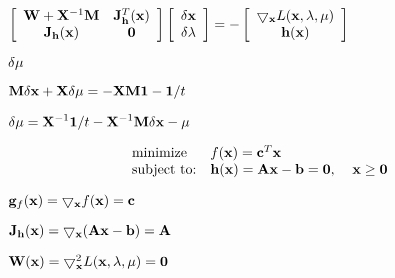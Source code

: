 \documentclass{article}
\def\lthtmlcheckvsize{\ifdim\ht\sizebox<\vsize 
  \ifdim\wd\sizebox<\hsize\expandafter\hfill\fi \expandafter\vfill
  \else\expandafter\vss\fi}%
\begin{document}
{\newpage\clearpage
{}%
$\displaystyle \left[\begin{array}{ccc}
{\bf W}+{\bf X}^{-1}{\bf M} & {\bf J}^T_{\bf h}({\bf x})\\
{\bf J}_{\bf h}({\bf x}) & {\bf0} \end{array}\right]
\left[\begin{array}{c}
\delta{\bf x}\\\delta{\bf\lambda}\end{array}\right]
=-\left[\begin{array}{c}
\bigtriangledown_{\bf x}L({\bf x},{\bf\lambda},{\bf\mu})\\
{\bf h}({\bf x})
\end{array}\right]$%
\lthtmlindisplaymathZ
\lthtmlcheckvsize\clearpage}

{\newpage\clearpage
{}%
$ \delta{\bf\mu}$%
\lthtmlindisplaymathZ
\lthtmlcheckvsize\clearpage}

{\newpage\clearpage
{}%
$\displaystyle {\bf M}\delta{\bf x}+{\bf X}\delta\mu=-{\bf XM1}-{\bf 1}/t$%
\lthtmlindisplaymathZ
\lthtmlcheckvsize\clearpage}

{\newpage\clearpage
{}%
$\displaystyle \delta{\bf\mu}={\bf X}^{-1}{\bf 1}/t-{\bf X}^{-1}{\bf M}\delta{\bf x}-{\bf\mu}$%
\lthtmlindisplaymathZ
\lthtmlcheckvsize\clearpage}

{\newpage\clearpage
{}%
\begin{displaymath}\begin{array}{ll}
\mbox{minimize}  &  f({\bf x})={\bf c}^T{\bf x}\\
\mbox{subject to:} & {\bf h}({\bf x})={\bf Ax}-{\bf b}={\bf0},
\;\;\;\;{\bf x}\ge{\bf0}
\end{array}\end{displaymath}%
\lthtmldisplayZ
\lthtmlcheckvsize\clearpage}

{\newpage\clearpage
{}%
$ {\bf g}_f({\bf x})=\bigtriangledown_{\bf x}f({\bf x})={\bf c}$%
\lthtmlindisplaymathZ
\lthtmlcheckvsize\clearpage}

{\newpage\clearpage
{}%
$ {\bf J}_{\bf h}({\bf x})=\bigtriangledown_{\bf x}({\bf Ax}-{\bf b})={\bf A}$%
\lthtmlindisplaymathZ
\lthtmlcheckvsize\clearpage}

{\newpage\clearpage
{}%
$ {\bf W}({\bf x})=\bigtriangledown^2_{\bf x} L({\bf x},{\bf\lambda},{\bf\mu})={\bf0}$%
\lthtmlindisplaymathZ
\lthtmlcheckvsize\clearpage}
\end{document}
